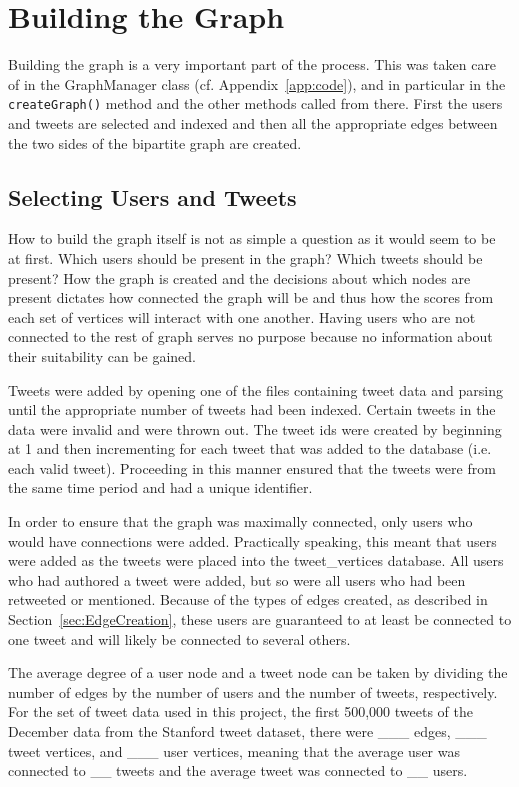 \section{Building the Graph}
\label{sec:BuildingTheGraph}

Building the graph is a very important part of the process. This was taken care of in the GraphManager class (cf. Appendix~\ref{app:code}), and in particular in the \texttt{createGraph()} method and the other methods called from there. First the users and tweets are selected and indexed and then all the appropriate edges between the two sides of the bipartite graph are created.

\subsection{Selecting Users and Tweets}

How to build the graph itself is not as simple a question as it would seem to be at first. Which users should be present in the graph? Which tweets should be present? How the graph is created and the decisions about which nodes are present dictates how connected the graph will be and thus how the scores from each set of vertices will interact with one another. Having users who are not connected to the rest of graph serves no purpose because no information about their suitability can be gained.

Tweets were added by opening one of the files containing tweet data and parsing until the appropriate number of tweets had been indexed. Certain tweets in the data were invalid and were thrown out. The tweet ids were created by beginning at 1 and then incrementing for each tweet that was added to the database (i.e. each valid tweet). Proceeding in this manner ensured that the tweets were from the same time period and had a unique identifier.

In order to ensure that the graph was maximally connected, only users who would have connections were added. Practically speaking, this meant that users were added as the tweets were placed into the tweet\_vertices database. All users who had authored a tweet were added, but so were all users who had been retweeted or mentioned. Because of the types of edges created, as described in Section~\ref{sec:EdgeCreation}, these users are guaranteed to at least be connected to one tweet and will likely be connected to several others.

The average degree of a user node and a tweet node can be taken by dividing the number of edges by the number of users and the number of tweets, respectively. For the set of tweet data used in this project, the first 500,000 tweets of the December data from the Stanford tweet dataset, there were \_\_\_ edges, \_\_\_ tweet vertices, and \_\_\_ user vertices, meaning that the average user was connected to \_\_ tweets and the average tweet was connected to \_\_ users.


